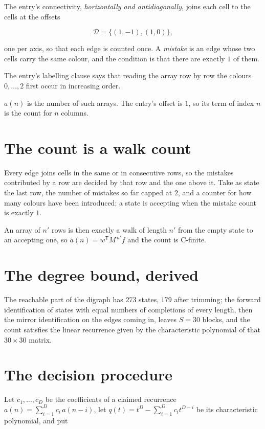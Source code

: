 \documentclass[11pt]{article}
\theoremstyle{definition}
\begin{document}
The entry's connectivity, {\itshape horizontally and antidiagonally}, joins each cell to the cells at the offsets

\[\mathcal{D} = \{(1,-1), (1,0)\},\]

one per axis, so that each edge is counted once. A {\itshape mistake} is an edge whose two cells carry the same colour, and the condition is that there are exactly $1$ of them.

The entry's labelling clause says that reading the array row by row the colours $0,\dots,2$ first occur in increasing order.

$a(n)$ is the number of such arrays. The entry's offset is 1, so its term of index $n$ is the count for $n$ columns.

\section{The count is a walk count}

Every edge joins cells in the same or in consecutive rows, so the mistakes contributed by a row are decided by that row and the one above it. Take as state the last row, the number of mistakes so far capped at $2$, and a counter for how many colours have been introduced; a state is accepting when the mistake count is exactly $1$.

An array of $n'$ rows is then exactly a walk of length $n'$ from the empty state to an accepting one, so $a(n) = w^{\mathsf T}M^{\,n'}f$ and the count is C-finite.

\section{The degree bound, derived}

The reachable part of the digraph has $273$ states, $179$ after trimming; the forward identification of states with equal numbers of completions of every length, then the mirror identification on the edges coming in, leaves $S = 30$ blocks, and the count satisfies the linear recurrence given by the characteristic polynomial of that $30\times30$ matrix.

\section{The decision procedure}

Let $c_1,\dots,c_D$ be the coefficients of a claimed recurrence $a(n) = \sum_{i=1}^{D} c_i\,a(n-i)$, let $q(t) = t^{D} - \sum_{i=1}^{D} c_i t^{D-i}$ be its characteristic polynomial, and put
\end{document}
